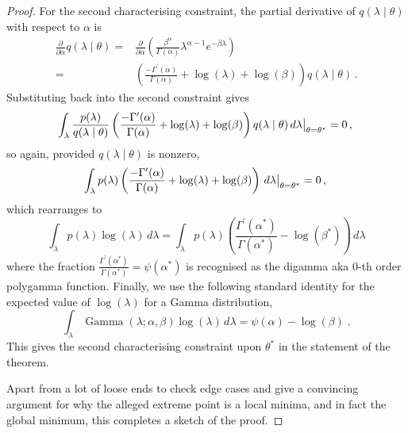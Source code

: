 \documentclass[twoside, 11pt]{article}
\DeclareMathOperator*{\gammad}{Gamma}
\begin{document}
\begin{proof}
For the second characterising constraint, the partial derivative of $q(\lambda \mid \theta)$ with respect to $\alpha$ is
\begin{align}
\frac{\partial}{\partial \alpha} q(\lambda \mid \theta)
= & 
\frac{\partial}{\partial \alpha} \left( \frac{\beta^{\alpha}}{\Gamma(\alpha)} \lambda^{\alpha-1} e^{-\beta \lambda} \right) \\
= & \left( \frac{-\Gamma^{\prime}(\alpha)}{\Gamma(\alpha)} + \log(\lambda) + \log(\beta) \right) q(\lambda \mid \theta) \, .
\end{align}
Substituting back into the second constraint gives
\begin{equation}
\int_{\lambda}
\frac{p(\lambda)}{q(\lambda \mid \theta)}
\left( \frac{-\Gamma^{\prime}(\alpha)}{\Gamma(\alpha)} + \log(\lambda) + \log(\beta) \right) q(\lambda \mid \theta)
\, d\lambda \bigr \vert_{\theta=\theta^*} = 0 \, , \\
\end{equation}
so again, provided $q(\lambda \mid \theta)$ is nonzero,
\begin{equation}
\int_{\lambda}
p(\lambda)
\left( \frac{-\Gamma^{\prime}(\alpha)}{\Gamma(\alpha)} + \log(\lambda) + \log(\beta) \right)
\, d\lambda \bigr \vert_{\theta=\theta^*} = 0 \, , \\
\end{equation}
which rearranges to
\begin{equation}
\int_{\lambda}
p(\lambda) \log(\lambda) \, d\lambda
=
\int_{\lambda}
p(\lambda)
\left( \frac{\Gamma^{\prime}(\alpha^*)}{\Gamma(\alpha^*)} - \log(\beta^*) \right)
\, d\lambda
\end{equation}
where the fraction $\frac{\Gamma^{\prime}(\alpha^*)}{\Gamma(\alpha^*)} = \psi(\alpha^*)$ is recognised as the digamma aka 0-th order polygamma function. Finally, we use the following standard identity for the expected value of $\log(\lambda)$ for a Gamma distribution,
\begin{equation}
\int_{\lambda}
\gammad(\lambda ; \alpha, \beta ) \log(\lambda) \, d\lambda = \psi(\alpha) - \log(\beta) \; .
\end{equation}
This gives the second characterising constraint upon $\theta^*$ in the statement of the theorem.

Apart from a lot of loose ends to check edge cases and give a convincing argument for why the alleged extreme point is a local minima, and in fact the global minimum, this completes a sketch of the proof.

\end{proof}
\end{document}
